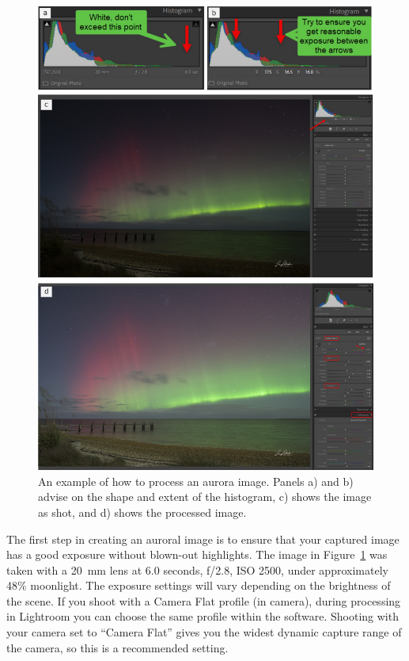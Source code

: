 \documentclass{article}
\begin{document}
\begin{figure}
  \includegraphics[width=\linewidth]{Fig13_ImageHistograms.png}
  \caption{An example of how to process an aurora image. Panels a) and b) advise on the shape and extent of the histogram, c) shows the image as shot, and d) shows the processed image.}
  \label{processing}
\end{figure}

The first step in creating an auroral image is to ensure that your captured image has a good exposure without blown-out highlights. The image in Figure~\ref{processing} was taken with a 20~mm lens at 6.0 seconds, f/2.8, ISO 2500, under approximately 48\% moonlight. The exposure settings will vary depending on the brightness of the scene. If you shoot with a Camera Flat profile (in camera), during processing in Lightroom you can choose the same profile within the software.  Shooting with your camera set to ``Camera Flat'' gives you the widest dynamic capture range of the camera, so this is a recommended setting. 
\end{document}
